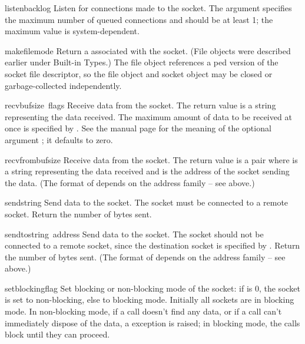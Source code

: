 \begin{funcdesc}{listen}{backlog}
Listen for connections made to the socket.
The argument specifies the maximum number of queued connections and
should be at least 1; the maximum value is system-dependent.
\end{funcdesc}

\begin{funcdesc}{makefile}{mode}
Return a  associated with the socket.
(File objects were described earlier under Built-in Types.)
The file object references a ped version of the socket file
descriptor, so the file object and socket object may be closed or
garbage-collected independently.
\end{funcdesc}

\begin{funcdesc}{recv}{bufsize\, flags}
Receive data from the socket.  The return value is a string representing
the data received.  The maximum amount of data to be received
at once is specified by .  See the \UNIX{} manual page
for the meaning of the optional argument ; it defaults to
zero.
\end{funcdesc}

\begin{funcdesc}{recvfrom}{bufsize}
Receive data from the socket.  The return value is a pair
 where  is a string
representing the data received and  is the address of the
socket sending the data.
(The format of  depends on the address family -- see above.)
\end{funcdesc}

\begin{funcdesc}{send}{string}
Send data to the socket.  The socket must be connected to a remote
socket.  Return the number of bytes sent.
\end{funcdesc}

\begin{funcdesc}{sendto}{string\, address}
Send data to the socket.  The socket should not be connected to a
remote socket, since the destination socket is specified by
.  Return the number of bytes sent.
(The format of  depends on the address family -- see above.)
\end{funcdesc}

\begin{funcdesc}{setblocking}{flag}
Set blocking or non-blocking mode of the socket: if  is 0,
the socket is set to non-blocking, else to blocking mode.  Initially
all sockets are in blocking mode.  In non-blocking mode, if a
 call doesn't find any data, or if a  call can't
immediately dispose of the data, a  exception is
raised; in blocking mode, the calls block until they can proceed.
\end{funcdesc}

